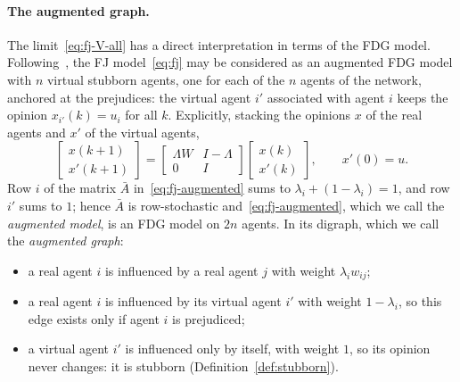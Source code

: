 \paragraph{The augmented graph.}
The limit~\eqref{eq:fj-V-all} has a direct interpretation in terms of the FDG model.
Following~\cite{proskurnikov2017tutorial}, the FJ model~\eqref{eq:fj} may be
considered as an augmented FDG model with $n$ virtual stubborn agents, one for each of
the $n$ agents of the network, anchored at the prejudices:
 the virtual agent $i'$ associated with agent $i$ keeps the opinion
$x_{i'}(k) = u_i$ for all $k$. Explicitly, stacking the
opinions $x$ of the real agents and $x'$ of the virtual agents,
\begin{equation}\label{eq:fj-augmented}
  \begin{bmatrix} x(k+1) \\ x'(k+1) \end{bmatrix}
  = \begin{bmatrix} \Lambda W & I - \Lambda \\ 0 & I \end{bmatrix}
    \begin{bmatrix} x(k) \\ x'(k) \end{bmatrix},
  \qquad x'(0) = u .
\end{equation}
Row $i$ of the matrix $\bar A$ in~\eqref{eq:fj-augmented} sums to
$\lambda_i + (1-\lambda_i) = 1$, and row $i'$ sums to $1$; hence $\bar A$ is
row-stochastic and~\eqref{eq:fj-augmented}, which we call the \emph{augmented model}, is
an FDG model on $2n$ agents.
 In its digraph, which we
call the \emph{augmented graph}:
\begin{itemize}
  \item a real agent $i$ is influenced by a real agent $j$ with weight
        $\lambda_i w_{ij}$;
  \item a real agent $i$ is influenced by its virtual agent $i'$ with weight
        $1 - \lambda_i$, so this edge exists only if agent $i$ is prejudiced;
  \item a virtual agent $i'$ is influenced only by itself, with weight $1$, so its
        opinion never changes: it is stubborn (Definition~\ref{def:stubborn}).
\end{itemize}
